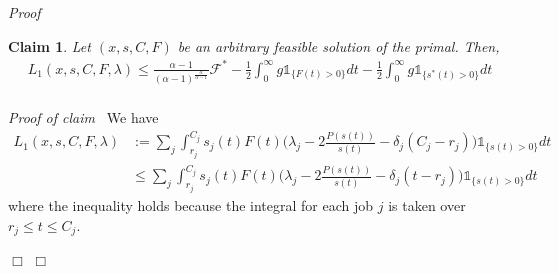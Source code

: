 \documentclass[11pt]{article}
\newenvironment{proof}{\noindent\emph{Proof\ }}{\hspace*{\fill}$\Box$\medskip}
\newenvironment{claimproof}{\noindent\emph{Proof of claim\ }}{\hspace*{\fill}$\Box$\medskip}
\newtheorem{claim}{Claim}
\newcommand{\one}{\ensuremath{\mathds{1}}}
\begin{document}
\begin{proof}
\setcounter{claim}{1}
\begin{claim}		\label{claim:general-energy-L1}
Let $(x,s,C,F)$ be an arbitrary feasible solution of the primal. Then,
\begin{align*}
L_{1}(x,s,C, F, \lambda) 
		\leq \frac{\alpha-1}{(\alpha-1)^{\frac{\alpha}{\alpha-1}}} 
			\mathcal{F}^{*}
			- \frac{1}{2} \int_{0}^{\infty} g\one_{\{F(t) > 0\}} dt 
			- \frac{1}{2} \int_{0}^{\infty} g\one_{\{s^{*}(t) > 0\}}  dt \\
\end{align*}
\end{claim}
\begin{claimproof}
We have
\begin{align*}
L_{1}(x,s,C, F, \lambda) & :=  \sum_{j} \int_{r_{j}}^{C_{j}} s_{j}(t)F(t)
			\biggl( \lambda_{j} - 2\frac{P(s(t))}{s(t)} 
								- \delta_{j}(C_{j} - r_{j}) \biggl)  \one_{\{s(t) > 0\}} dt  \\
&\leq \sum_{j} \int_{r_{j}}^{C_{j}} s_{j}(t)F(t)
			\biggl( \lambda_{j} - 2\frac{P(s(t))}{s(t)} 
								- \delta_{j}(t - r_{j}) \biggl)  \one_{\{s(t) > 0\}} dt 
\end{align*}
where the inequality holds because the integral for each job $j$ is taken over $r_{j} \leq t \leq C_{j}$. 


\end{claimproof}
\end{proof}
\end{document}
